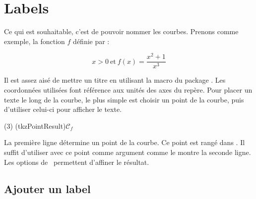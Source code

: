 \section{Labels} 

Ce qui est souhaitable, c'est de pouvoir nommer les courbes. Prenons comme exemple, la fonction $f$ définie par :

\[
   x>0\ \text{et}\ f(x)=\dfrac{x^2+1}{x^3} 
\]

Il est assez aisé de mettre un titre en utilisant la macro  du package . Les coordonnées utilisées font référence aux unités des axes du repère. Pour placer un texte le long de la courbe, le plus simple est choisir un point de la courbe, puis d'utiliser celui-ci pour afficher le texte. 

\begin{tkzltxexample}[num]
  \tkzDefPointByFct(3)
  (tkzPointResult){${\mathcal{C}}_f$}
\end{tkzltxexample}

La première ligne détermine un point de la courbe. Ce point est rangé dans . Il suffit d'utiliser  avec ce point comme argument comme le montre la seconde ligne. Les options de \TIKZ\ permettent d'affiner le résultat.

\subsection{Ajouter un label}
 
\begin{center}
\begin{tkzexample}[vbox]    
\end{tkzexample}
\end{center}


